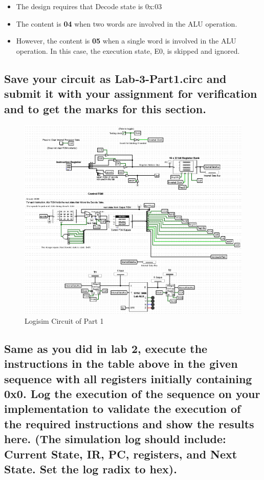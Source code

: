 \documentclass{article}
\begin{document}
	\begin{itemize}
		\item The design requires that Decode state is 0x:03
		\item The content is \textbf{04} when two words are involved in the ALU operation.
		\item However, the content is \textbf{05} when a single word is involved in the ALU operation.
		In this case, the execution state, E0, is skipped and ignored.
	\end{itemize}

	\pagebreak

	\subsection{Save your circuit as Lab‐3-Part1.circ and submit it with your assignment for verification and to get the marks for this section.}
	\begin{figure}[!ht]
		\centering
		\includegraphics[width=0.72\textheight]{circuit_part1.png}
		\caption{Logisim Circuit of Part 1}
	\end{figure}

	\pagebreak

	\subsection{Same as you did in lab 2, execute the instructions in the table above in the given sequence with all registers initially containing 0x0. Log the execution of the sequence on your implementation to validate the execution of the required instructions and show the results here. (The simulation log should include: Current State, IR, PC, registers, and Next State. Set the log radix to hex).}
	
\end{document}
